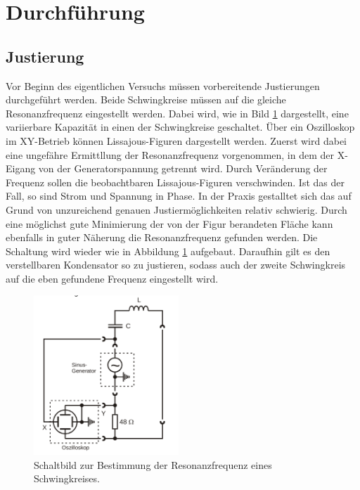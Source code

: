 \section{Durchführung}
\label{sec:Durchführung}

\subsection{Justierung} 
\label{sub:Justierung}


Vor Beginn des eigentlichen Versuchs müssen vorbereitende Justierungen durchgeführt werden. Beide Schwingkreise müssen 
auf die gleiche Resonanzfrequenz eingestellt werden.
Dabei wird, wie in Bild \ref{fig:bild5} dargestellt, eine variierbare Kapazität in einen der Schwingkreise geschaltet. Über ein
Oszilloskop im XY-Betrieb können Lissajous-Figuren dargestellt werden. Zuerst wird dabei eine ungefähre Ermittllung der Resonanzfrequenz vorgenommen, in dem der X-Eigang von der 
Generatorspannung getrennt wird. Durch Veränderung der Frequenz sollen die beobachtbaren Lissajous-Figuren verschwinden. Ist das der Fall, so sind Strom und Spannung in Phase. In der Praxis gestalltet sich das auf Grund von unzureichend genauen Justiermöglichkeiten relativ schwierig.
Durch eine möglichst gute Minimierung der von der Figur berandeten Fläche kann
ebenfalls in guter Näherung die Resonanzfrequenz gefunden werden. Die Schaltung wird wieder wie in Abbildung \ref{fig:bild5} aufgebaut. Daraufhin gilt es den verstellbaren Kondensator so zu justieren, sodass auch der zweite Schwingkreis auf die eben gefundene Frequenz eingestellt wird.


\begin{figure}

    \centering
    \includegraphics[height=6.0cm]{data/Bild5.png}
    \caption{Schaltbild zur Bestimmung der Resonanzfrequenz eines Schwingkreises.}
    \label{fig:bild5}
\end{figure}

